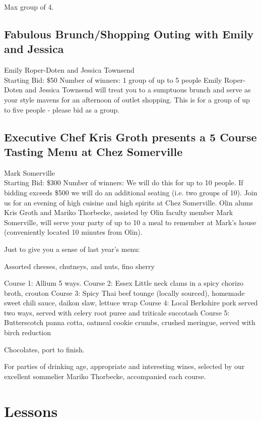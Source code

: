 \documentclass[11pt]{article}
\begin{document}
Max group of 4.
\subsection{Fabulous Brunch/Shopping Outing with Emily and Jessica}
Emily Roper-Doten and Jessica Townsend
\\
Starting Bid: \$50
\newline
Number of winners: 1 group of up to 5 people
\newline
Emily Roper-Doten and Jessica Townsend will treat you to a sumptuous brunch and serve as your style mavens for an afternoon of outlet shopping. This is for a group of up to five people - please bid as a group.
\subsection{Executive Chef Kris Groth presents a 5 Course Tasting Menu at Chez Somerville}
Mark Somerville
\\
Starting Bid: \$300
\newline
Number of winners: We will do this for up to 10 people.  If bidding exceeds \$500 we will do an additional seating (i.e. two groups of 10).
\newline
Join us for an evening of high cuisine and high spirits at Chez Somerville.  Olin alums Kris Groth and Mariko Thorbecke, assisted by Olin faculty member Mark Somerville, will serve your party of up to 10  a meal to remember at Mark's house (conveniently located 10 minutes from Olin). 

Just to give you a sense of last year's menu:

Assorted cheeses, chutneys, and nuts, fino sherry

Course 1: Allium 5 ways.  
Course 2: Essex Little neck clams in a spicy chorizo broth, crouton
Course 3: Spicy Thai beef tounge (locally sourced), homemade sweet chili sauce, daikon slaw, lettuce wrap
Course 4: Local Berkshire pork served two ways, served with celery root puree and triticale succotash
Course 5: Butterscotch panna cotta, oatmeal cookie crumbs, crushed meringue, served with birch reduction

Chocolates, port to finish.

For parties of drinking age, appropriate and interesting wines, selected by our excellent sommelier Mariko Thorbecke, accompanied each course.
\section{Lessons}
\end{document}

